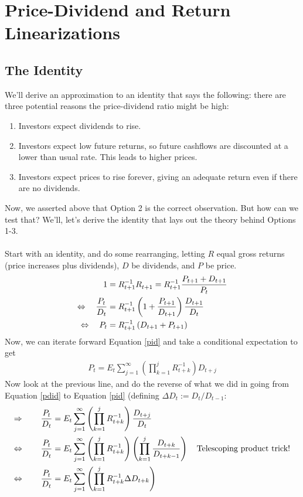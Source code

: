 \documentclass[a4paper,12pt]{scrartcl}
\begin{document}
\newpage
\section{Price-Dividend and Return Linearizations}

\subsection{The Identity}

We'll derive an approximation to an identity that says the following:
there are three potential reasons the price-dividend ratio might be 
high:
\begin{enumerate}
    \item Investors expect dividends to rise.
    \item Investors expect low future returns, so future cashflows
	are discounted at a lower than usual rate. This leads
	to higher prices.
    \item Investors expect prices to rise forever, giving an 
	adequate return even if there are no dividends.
\end{enumerate}
Now, we asserted above that Option 2 is the correct observation.
But how can we test that?  We'll, let's derive the identity that
lays out the theory behind Options 1-3.
\\
\\
Start with an identity, and do some rearranging, letting $R$ equal
gross returns (price increases plus dividends), $D$ be dividends, 
and $P$ be price.
\begin{align}
    1 &= R^{-1}_{t+1} R^{}_{t+1} = R^{-1}_{t+1} \frac{P_{t+1} + D_{t+1}}{P_t} \notag \\
    \Leftrightarrow \quad \frac{P_t}{D_t} &= 
	R^{-1}_{t+1} \left( 1 + \frac{P_{t+1}}{D_{t+1}}\right) \frac{D_{t+1}}{D_t}
	\label{pdid} \\
    \Leftrightarrow \quad {P_t} &= 
	R^{-1}_{t+1} \left( {D_{t+1}} + {P_{t+1}}\right) 
	\label{pid} 
\end{align}
Now, we can iterate forward Equation \ref{pid} and take a conditional
expectation to get
\begin{align}
    \label{pid2}
    P_t = E_t \sum^\infty_{j=1} \left(\prod^j_{k=1} R^{-1}_{t+k} \right)
	D_{t+j} 
\end{align}
Now look at the previous line, and do the reverse of what we did 
in going from Equation \ref{pdid} to Equation \ref{pid} (defining
$\Delta D_t := D_t / D_{t-1}$:
\begin{align}
    \Rightarrow \qquad \frac{P_t}{D_t} &= E_t \sum^\infty_{j=1} 
	\left(\prod^j_{k=1} R^{-1}_{t+k} \right)  \frac{D_{t+j}}{D_t} 
	\notag \\
    \Leftrightarrow \qquad \frac{P_t}{D_t} &= E_t \sum^\infty_{j=1} 
	\left(\prod^j_{k=1} R^{-1}_{t+k} \right)  
	\left(\prod^{j}_{k=1} \frac{D_{t+k}}{D_{t+k-1}}\right) \quad
	\text{Telescoping product trick!} \notag \\
    \Leftrightarrow \qquad \frac{P_t}{D_t} &= E_t \sum^\infty_{j=1} 
	\left(\prod^j_{k=1} R^{-1}_{t+k} \Delta D_{t+k} \right)  
	\label{pdid2}
\end{align}
\end{document}
